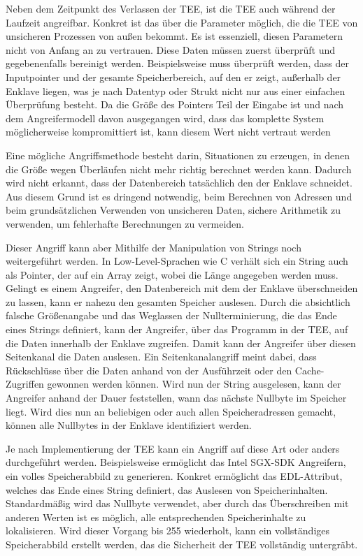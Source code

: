 Neben dem Zeitpunkt des Verlassen der TEE, ist die TEE auch während der Laufzeit angreifbar. Konkret ist das über die Parameter möglich, die die TEE von unsicheren Prozessen von außen bekommt. Es ist essenziell, diesen Parametern nicht von Anfang an zu vertrauen. Diese Daten müssen zuerst überprüft und gegebenenfalls bereinigt werden.  Beispielsweise muss überprüft werden, dass der Inputpointer und der gesamte Speicherbereich, auf den er zeigt, außerhalb der Enklave liegen, was je nach Datentyp oder Strukt nicht nur aus einer einfachen Überprüfung besteht. Da die Größe des Pointers Teil der Eingabe ist und nach dem Angreifermodell davon ausgegangen wird, dass das komplette System möglicherweise kompromittiert ist, kann diesem Wert nicht vertraut werden

Eine mögliche Angriffsmethode besteht darin, Situationen zu erzeugen, in denen die Größe wegen Überläufen nicht mehr richtig berechnet werden kann. Dadurch wird nicht erkannt, dass der Datenbereich tatsächlich den der Enklave schneidet. Aus diesem Grund ist es dringend notwendig, beim Berechnen von Adressen und beim grundsätzlichen Verwenden von unsicheren Daten, sichere Arithmetik zu verwenden, um fehlerhafte Berechnungen zu vermeiden.

Dieser Angriff kann aber Mithilfe der Manipulation von Strings noch weitergeführt werden. In Low-Level-Sprachen wie C verhält sich ein String auch als Pointer, der auf ein Array zeigt, wobei die Länge angegeben werden muss. 
Gelingt es einem Angreifer, den Datenbereich mit dem der Enklave überschneiden zu lassen, kann er nahezu den gesamten Speicher auslesen. Durch die absichtlich falsche Größenangabe und das Weglassen der Nullterminierung, die das Ende eines Strings definiert, kann der Angreifer, über das Programm in der TEE, auf die Daten innerhalb der Enklave zugreifen. 
Damit kann der Angreifer über diesen Seitenkanal die Daten auslesen. 
Ein Seitenkanalangriff meint dabei, dass Rückschlüsse über die Daten anhand von der Ausführzeit oder den Cache-Zugriffen gewonnen werden können. Wird nun der String ausgelesen, kann der Angreifer anhand der Dauer feststellen, wann das nächste Nullbyte im Speicher liegt. 
Wird dies nun an beliebigen oder auch allen Speicheradressen gemacht, können alle Nullbytes in der Enklave identifiziert werden\cite{TEEPaper}.



Je nach Implementierung der TEE kann ein Angriff auf diese Art oder anders durchgeführt werden. Beispielsweise ermöglicht das Intel SGX-SDK Angreifern, ein volles Speicherabbild zu generieren. Konkret ermöglicht das EDL-Attribut, welches das Ende eines String definiert, das Auslesen von Speicherinhalten. Standardmäßig wird das Nullbyte verwendet, aber durch das Überschreiben mit anderen Werten ist es möglich, alle entsprechenden Speicherinhalte zu lokalisieren. Wird dieser Vorgang bis 255 wiederholt, kann ein vollständiges Speicherabbild erstellt werden, das die Sicherheit der TEE vollständig untergräbt\cite{IntelSGX, TEEPaper}.

